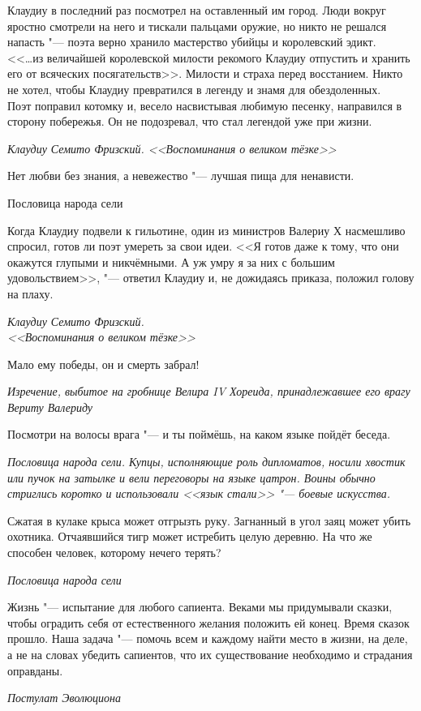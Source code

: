 \documentclass[a4paper,10pt]{book}
\begin{document}
\epigraph{Клаудиу в последний раз посмотрел на оставленный им город. Люди 
вокруг яростно 
смотрели на него и тискали пальцами оружие, но никто не решался напасть 
"--- поэта верно хранило мастерство убийцы и королевский эдикт.\\
<<\ldots из величайшей королевской милости рекомого Клаудиу отпустить и хранить 
его от всяческих посягательств>>. Милости и страха перед восстанием. Никто не 
хотел, чтобы Клаудиу превратился в легенду и знамя для обездоленных.\\
Поэт поправил котомку и, весело насвистывая любимую песенку, направился в 
сторону побережья. Он не подозревал, что стал легендой уже при жизни.}
{\textit{Клаудиу Семито Фризский. <<Воспоминания о великом тёзке>>}}

\epigraph{Нет любви без знания, а невежество "--- лучшая пища для ненависти.}
{Пословица народа сели}

\epigraph{Когда Клаудиу подвели к гильотине, один из министров Валериу Х 
насмешливо спросил, готов ли поэт умереть за свои идеи. <<Я готов даже к тому, 
что они 
окажутся глупыми и никчёмными. А уж умру я за них с большим удовольствием>>, 
"--- ответил Клаудиу и, не дожидаясь приказа, положил голову на плаху.}
{\textit{Клаудиу Семито Фризский.\\<<Воспоминания о великом тёзке>>}}

\epigraph{Мало ему победы, он и смерть забрал!}
{\textit{Изречение, выбитое на гробнице Велира IV Хореида, принадлежавшее его 
врагу 
Вериту Валериду}}

\epigraph{Посмотри на волосы врага "--- и ты поймёшь, на каком языке пойдёт 
беседа.}
{\textit{Пословица народа сели. Купцы, исполняющие роль дипломатов, носили 
хвостик или пучок на затылке и вели переговоры на языке цатрон. Воины обычно 
стриглись коротко и использовали <<язык стали>> "--- боевые искусства.}}

\epigraph{Сжатая в кулаке крыса может отгрызть руку. Загнанный в угол заяц 
может убить 
охотника. Отчаявшийся тигр может истребить целую деревню.
На что же способен человек, которому нечего терять?}
{\textit{Пословица народа сели}}

\epigraph{Жизнь "--- испытание для любого сапиента. Веками мы придумывали 
сказки, 
чтобы оградить себя от естественного желания положить ей 
конец. Время сказок прошло. Наша задача "--- помочь всем и каждому найти место 
в жизни, на деле, а не на словах убедить сапиентов, что их существование 
необходимо и страдания оправданы.}
{\textit{Постулат Эволюциона}}
\end{document}
